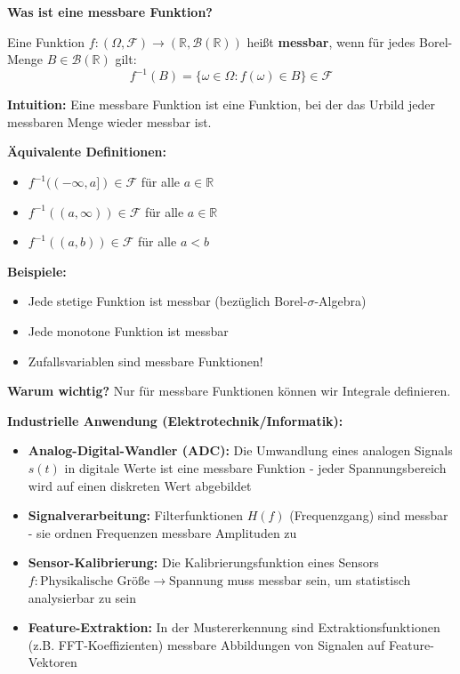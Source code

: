 \begin{denoobification}
\textbf{Was ist eine messbare Funktion?}

Eine Funktion $f: (\Omega, \mathcal{F}) \to (\mathbb{R}, \mathcal{B}(\mathbb{R}))$ heißt \textbf{messbar}, wenn für jedes Borel-Menge $B \in \mathcal{B}(\mathbb{R})$ gilt:
\[
f^{-1}(B) = \{\omega \in \Omega : f(\omega) \in B\} \in \mathcal{F}
\]

\textbf{Intuition:} Eine messbare Funktion ist eine Funktion, bei der das Urbild jeder messbaren Menge wieder messbar ist.

\textbf{Äquivalente Definitionen:}
\begin{itemize}
    \item $f^{-1}((-\infty, a]) \in \mathcal{F}$ für alle $a \in \mathbb{R}$
    \item $f^{-1}((a, \infty)) \in \mathcal{F}$ für alle $a \in \mathbb{R}$
    \item $f^{-1}((a, b)) \in \mathcal{F}$ für alle $a < b$
\end{itemize}

\textbf{Beispiele:}
\begin{itemize}
    \item Jede stetige Funktion ist messbar (bezüglich Borel-$\sigma$-Algebra)
    \item Jede monotone Funktion ist messbar
    \item Zufallsvariablen sind messbare Funktionen!
\end{itemize}

\textbf{Warum wichtig?} Nur für messbare Funktionen können wir Integrale definieren.

\textbf{Industrielle Anwendung (Elektrotechnik/Informatik):}
\begin{itemize}
    \item \textbf{Analog-Digital-Wandler (ADC):} Die Umwandlung eines analogen Signals $s(t)$ in digitale Werte ist eine messbare Funktion - jeder Spannungsbereich wird auf einen diskreten Wert abgebildet
    \item \textbf{Signalverarbeitung:} Filterfunktionen $H(f)$ (Frequenzgang) sind messbar - sie ordnen Frequenzen messbare Amplituden zu
    \item \textbf{Sensor-Kalibrierung:} Die Kalibrierungsfunktion eines Sensors $f: \text{Physikalische Größe} \to \text{Spannung}$ muss messbar sein, um statistisch analysierbar zu sein
    \item \textbf{Feature-Extraktion:} In der Mustererkennung sind Extraktionsfunktionen (z.B. FFT-Koeffizienten) messbare Abbildungen von Signalen auf Feature-Vektoren
\end{itemize}


\end{denoobification}
